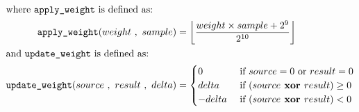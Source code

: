 {{{}
\EALGORITHM
\par
\noindent
\begin{align*}
\intertext{where \texttt{apply\_weight} is defined as:}
\texttt{apply\_weight}(weight~,~sample) &= \left\lfloor\frac{weight \times sample + 2 ^ 9}{2 ^ {10}}\right\rfloor \\
\intertext{and \texttt{update\_weight} is defined as:}
\texttt{update\_weight}(source~,~result~,~delta) &=
\begin{cases}
0 & \text{ if } source = 0 \text{ or } result = 0 \\
delta & \text{ if } (source \textbf{ xor } result ) \geq 0 \\
-delta & \text{ if } (source \textbf{ xor } result) < 0
\end{cases}
\end{align*}

}

\clearpage

}
